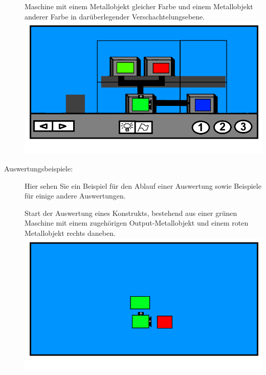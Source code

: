 \documentclass{scrartcl}
\begin{document}
\begin{description}
		\begin{minipage}{1\textwidth}
			Maschine mit einem Metallobjekt gleicher Farbe und einem Metallobjekt anderer Farbe in darüberlegender Verschachtelungsebene.\\
			\includegraphics[scale=0.5]{assets/LevelBsp2Out1OC}\\
		\end{minipage}

	\item[Auswertungsbeispiele:] \label{Levelaufbau:Auswertungsbeispiele} Hier sehen Sie ein Beispiel für den Ablauf einer Auswertung sowie Beispiele für einige andere Auswertungen.\\
	
		\begin{minipage}{1\textwidth}
			Start der Auswertung eines Konstrukts, bestehend aus einer grünen Maschine mit einem zugehörigen Output-Metallobjekt und einem roten Metallobjekt rechts daneben.\\ 
			\includegraphics[scale=0.5]{assets/AuswertungAnimPic1}
		\end{minipage}
		

\end{description}
\end{document}
